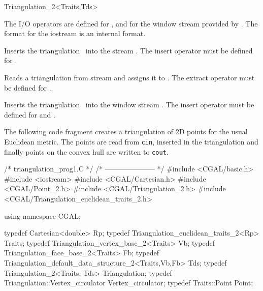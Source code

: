 \begin{ccClassTemplate}{Triangulation_2<Traits,Tds>}


The I/O operators are defined for , and for
the window stream provided by \cgal. The format for the iostream
is an internal format. 


{Inserts the triangulation \ccVar\ into the stream .
\ccPrecond The insert operator must be defined for .}

{Reads a triangulation from stream  and assigns it
to \ccVar. \ccPrecond The extract operator must be defined for .}


{Inserts the triangulation \ccVar\ into the window stream .
The insert operator must be defined for 
and .}

\ccExample

The following code fragment creates a  triangulation of 2D points
for the  usual Euclidean metric. The points are read from {\tt cin},
inserted in the triangulation 
and finally points on the convex hull are written to {\tt cout}. 


\begin{cprog}
/* triangulation_prog1.C */
/* --------------------- */
#include <CGAL/basic.h>
#include <iostream>
#include <CGAL/Cartesian.h>
#include <CGAL/Point_2.h>
#include <CGAL/Triangulation_2.h>
#include <CGAL/Triangulation_euclidean_traits_2.h>

using namespace CGAL;

typedef Cartesian<double> Rp;
typedef Triangulation_euclidean_traits_2<Rp> Traits;
typedef Triangulation_vertex_base_2<Traits> Vb;
typedef Triangulation_face_base_2<Traits>  Fb;
typedef Triangulation_default_data_structure_2<Traits,Vb,Fb> Tds;
typedef Triangulation_2<Traits, Tds> Triangulation;
typedef Triangulation::Vertex_circulator Vertex_circulator;
typedef Traits::Point   Point;


\end{cprog}
\end{ccClassTemplate}
